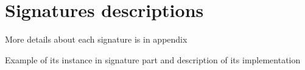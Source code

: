 \chapter{Signatures descriptions} \label{app:signatures}

More details about each signature is in appendix 

Example of its instance in signature part and description of its implementation
